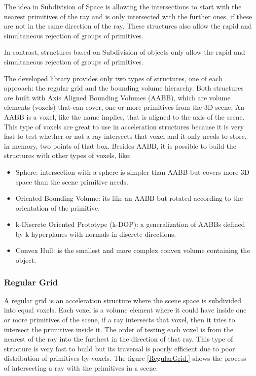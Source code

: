 \par
The idea in Subdivision of Space is allowing the intersections to start with the nearest primitives of the ray and is only intersected with the further ones, if these are not in the same direction of the ray.
These structures also allow the rapid and simultaneous rejection of groups of primitives.

\par
In contrast, structures based on Subdivision of objects only allow the rapid and simultaneous rejection of groups of primitives.

\par
The developed library provides only two types of structures, one of each approach: the regular grid and the bounding volume hierarchy.
Both structures are built with Axis Aligned Bounding Volumes (AABB), which are volume elements (voxels) that can cover, one or more primitives from the 3D scene.
An AABB is a voxel, like the name implies, that is aligned to the axis of the scene.
This type of voxels are great to use in acceleration structures because it is very fast to test whether or not a ray intersects that voxel and it only needs to store, in memory, two points of that box.
Besides AABB, it is possible to build the structures with other types of voxels, like:

\begin{itemize}
	\item Sphere: intersection with a sphere is simpler than AABB but covers more 3D space than the scene primitive needs.
	\item Oriented Bounding Volume: its like an AABB but rotated according to the orientation of the primitive.
	\item k-Discrete Oriented Prototype (k-DOP): a generalization of AABBs defined by k hyperplanes with normals in discrete directions.
	\item Convex Hull: is the smallest and more complex convex volume containing the object.
\end{itemize}

\subsubsection{Regular Grid}

\par
A regular grid is an acceleration structure where the scene space is subdivided into equal voxels.
Each voxel is a volume element where it could have inside one or more primitives of the scene, if a ray intersects that voxel, then it tries to intersect the primitives inside it.
The order of testing each voxel is from the nearest of the ray into the furthest in the direction of that ray.
This type of structure is very fast to build but its traversal is poorly efficient due to poor distribution of primitives by voxels.
The figure \ref{RegularGrid.} shows the process of intersecting a ray with the primitives in a scene.

